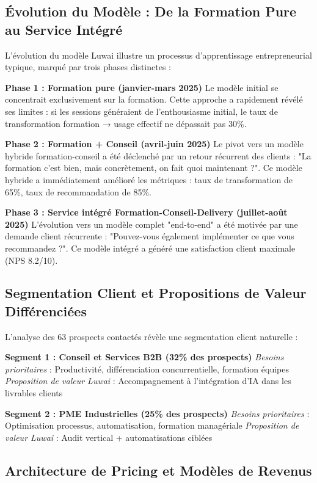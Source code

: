 \documentclass[12pt,a4paper]{report}
\begin{document}
\subsection{Évolution du Modèle : De la Formation Pure au Service Intégré}

L'évolution du modèle Luwai illustre un processus d'apprentissage entrepreneurial typique, marqué par trois phases distinctes :

\textbf{Phase 1 : Formation pure (janvier-mars 2025)}
Le modèle initial se concentrait exclusivement sur la formation. Cette approche a rapidement révélé ses limites : si les sessions généraient de l'enthousiasme initial, le taux de transformation formation → usage effectif ne dépassait pas 30\%.

\textbf{Phase 2 : Formation + Conseil (avril-juin 2025)}
Le pivot vers un modèle hybride formation-conseil a été déclenché par un retour récurrent des clients : "La formation c'est bien, mais concrètement, on fait quoi maintenant ?". Ce modèle hybride a immédiatement amélioré les métriques : taux de transformation de 65\%, taux de recommandation de 85\%.

\textbf{Phase 3 : Service intégré Formation-Conseil-Delivery (juillet-août 2025)}
L'évolution vers un modèle complet "end-to-end" a été motivée par une demande client récurrente : "Pouvez-vous également implémenter ce que vous recommandez ?". Ce modèle intégré a généré une satisfaction client maximale (NPS 8.2/10).

\subsection{Segmentation Client et Propositions de Valeur Différenciées}

L'analyse des 63 prospects contactés révèle une segmentation client naturelle :

\textbf{Segment 1 : Conseil et Services B2B (32\% des prospects)}
\emph{Besoins prioritaires} : Productivité, différenciation concurrentielle, formation équipes
\emph{Proposition de valeur Luwai} : Accompagnement à l'intégration d'IA dans les livrables clients

\textbf{Segment 2 : PME Industrielles (25\% des prospects)}
\emph{Besoins prioritaires} : Optimisation processus, automatisation, formation managériale
\emph{Proposition de valeur Luwai} : Audit vertical + automatisations ciblées

\subsection{Architecture de Pricing et Modèles de Revenus}
\end{document}
